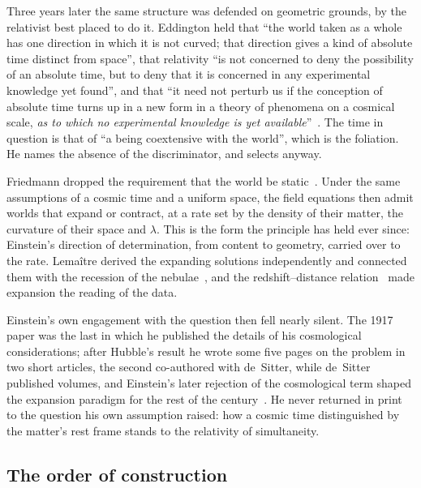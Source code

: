 \documentclass[11pt,a4paper]{article}
\begin{document}
Three years later the same structure was defended on geometric grounds, by the relativist best placed to do it. Eddington held that ``the world taken as a whole has one direction in which it is not curved; that direction gives a kind of absolute time distinct from space'', that relativity ``is not concerned to deny the possibility of an absolute time, but to deny that it is concerned in any experimental knowledge yet found'', and that ``it need not perturb us if the conception of absolute time turns up in a new form in a theory of phenomena on a cosmical scale, \emph{as to which no experimental knowledge is yet available}''~\cite{Eddington1920}. The time in question is that of ``a being coextensive with the world'', which is the foliation. He names the absence of the discriminator, and selects anyway.

Friedmann dropped the requirement that the world be static~\cite{Friedmann1922, Friedmann1924}. Under the same assumptions of a cosmic time and a uniform space, the field equations then admit worlds that expand or contract, at a rate set by the density of their matter, the curvature of their space and $\lambda$. This is the form the principle has held ever since: Einstein's direction of determination, from content to geometry, carried over to the rate. Lema\^itre derived the expanding solutions independently and connected them with the recession of the nebulae~\cite{Lemaitre1927}, and the redshift--distance relation~\cite{Hubble1929} made expansion the reading of the data.

Einstein's own engagement with the question then fell nearly silent. The 1917 paper was the last in which he published the details of his cosmological considerations; after Hubble's result he wrote some five pages on the problem in two short articles, the second co-authored with de~Sitter, while de~Sitter published volumes, and Einstein's later rejection of the cosmological term shaped the expansion paradigm for the rest of the century~\cite{JanzenEinsteinCosmology}. He never returned in print to the question his own assumption raised: how a cosmic time distinguished by the matter's rest frame stands to the relativity of simultaneity.

\subsection{The order of construction}\label{sec:order}
\end{document}
